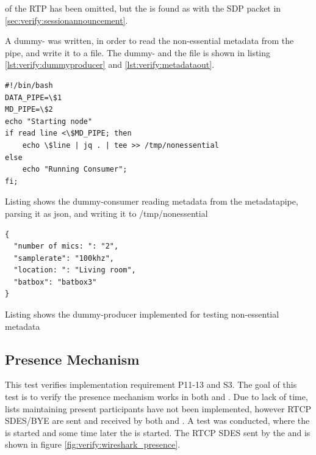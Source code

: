  of the RTP has been omitted, but the is found as with the SDP packet in \ref{sec:verify:sessionannouncement}.

A dummy-\pro{} was written, in order to read the non-essential metadata from the pipe, and write it to a file. The dummy-\con{} and the file is shown in listing \ref{lst:verify:dummyproducer} and \ref{lst:verify:metadataout}.


\begin{listing}[H] 
\begin{verbatim}
#!/bin/bash
DATA_PIPE=\$1
MD_PIPE=\$2
echo "Starting node"
if read line <\$MD_PIPE; then
	echo \$line | jq . | tee >> /tmp/nonessential
else
	echo "Running Consumer";
fi;  
\end{verbatim}
\caption{Listing shows the dummy-consumer reading metadata from the metadatapipe, parsing it as json, and writing it to /tmp/nonessential}
\label{lst:verify:nonessentialmetadata}
\end{listing}



\begin{listing}[H] 
\begin{verbatim}
{
  "number of mics: ": "2",
  "samplerate": "100khz",
  "location: ": "Living room",
  "batbox": "batbox3"
} 
\end{verbatim}
\caption{Listing shows the dummy-producer implemented for testing non-essential metadata}
\label{lst:verify:nonessentialmetadata}
\end{listing}





\subsection{Presence Mechanism} \label{sec:verify:presencemechanism}
This test verifies implementation requirement P11-13 and S3. The goal of this test is to verify the presence mechanism works in both \sub{} and \pub{}. Due to lack of time, lists maintaining present participants have not been implemented, however RTCP SDES/BYE are sent and received by both \pub{} and \sub{}.
A test was conducted, where the \pub{} is started and some time later the \sub{} is started. The RTCP SDES sent by the \pub{} and \sub{} is shown in figure \ref{fig:verify:wireshark_presence}.

